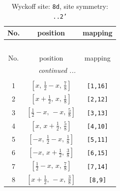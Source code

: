 \documentclass[fleqn,8pt]{jsarticle}
\begin{document}
\begin{longtable}{ccc}
\caption{Wyckoff site: {\tt 8d}, site symmetry: {\tt ..2'}}
 \\
 \hline \hline
No. & position & mapping \\ \hline \endfirsthead

\multicolumn{2}{l}{\tablename\ \thetable{}} \\
 \hline \hline
No. & position & mapping \\ \hline \endhead

 \hline \hline
\multicolumn{2}{r}{\footnotesize\it continued ...} \\ \endfoot

 \hline \hline
\multicolumn{2}{r}{} \\ \endlastfoot

1 & $\left[ x,\, \frac{1}{2} - x,\, \frac{7}{8} \right]$ & {\tt [1,16]} \\ \hline
2 & $\left[ x + \frac{1}{2},\, x,\, \frac{1}{8} \right]$ & {\tt [2,12]} \\ \hline
3 & $\left[ \frac{1}{2} - x,\, - x,\, \frac{5}{8} \right]$ & {\tt [3,13]} \\ \hline
4 & $\left[ x,\, x + \frac{1}{2},\, \frac{5}{8} \right]$ & {\tt [4,10]} \\ \hline
5 & $\left[ - x,\, \frac{1}{2} - x,\, \frac{1}{8} \right]$ & {\tt [5,11]} \\ \hline
6 & $\left[ - x,\, x + \frac{1}{2},\, \frac{3}{8} \right]$ & {\tt [6,15]} \\ \hline
7 & $\left[ \frac{1}{2} - x,\, x,\, \frac{7}{8} \right]$ & {\tt [7,14]} \\ \hline
8 & $\left[ x + \frac{1}{2},\, - x,\, \frac{3}{8} \right]$ & {\tt [8,9]} \\
\end{longtable}
\renewcommand{\arraystretch}{1.2}
\end{document}
